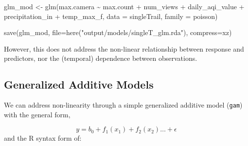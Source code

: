 \documentclass[
]{book}
\newenvironment{Shaded}{\begin{snugshade}}{\end{snugshade}}
\newcommand{\AttributeTok}[1]{\textcolor[rgb]{0.77,0.63,0.00}{#1}}
\newcommand{\FunctionTok}[1]{\textcolor[rgb]{0.00,0.00,0.00}{#1}}
\newcommand{\NormalTok}[1]{#1}
\newcommand{\OtherTok}[1]{\textcolor[rgb]{0.56,0.35,0.01}{#1}}
\newcommand{\SpecialCharTok}[1]{\textcolor[rgb]{0.00,0.00,0.00}{#1}}
\newcommand{\StringTok}[1]{\textcolor[rgb]{0.31,0.60,0.02}{#1}}
\begin{document}
\begin{Shaded}
\begin{Highlighting}[]
\NormalTok{glm\_mod }\OtherTok{\textless{}{-}} \FunctionTok{glm}\NormalTok{(max.camera }\SpecialCharTok{\textasciitilde{}} 
\NormalTok{                 max.count }\SpecialCharTok{+} 
\NormalTok{                 num\_views }\SpecialCharTok{+}
\NormalTok{                 daily\_aqi\_value }\SpecialCharTok{+} 
\NormalTok{                 precipitation\_in }\SpecialCharTok{+} 
\NormalTok{                 temp\_max\_f, }
               \AttributeTok{data =}\NormalTok{ singleTrail, }
               \AttributeTok{family =}\NormalTok{ poisson)}

\FunctionTok{save}\NormalTok{(glm\_mod, }
     \AttributeTok{file=}\FunctionTok{here}\NormalTok{(}\StringTok{"output/models/singleT\_glm.rda"}\NormalTok{), }
     \AttributeTok{compress=}\StringTok{\textquotesingle{}xz\textquotesingle{}}\NormalTok{)}
\end{Highlighting}
\end{Shaded}

However, this does not address the non-linear relationship between response and predictors, nor the (temporal) dependence between observations.

\hypertarget{generalized-additive-models}{%
\subsection{Generalized Additive Models}\label{generalized-additive-models}}

We can address non-linearity through a simple generalized additive model (\texttt{gam}) with the general form,

\[
y = b_0 + f_1(x_1) + f_2(x_2)\dots + \epsilon
\]
and the R syntax form of:
\end{document}
